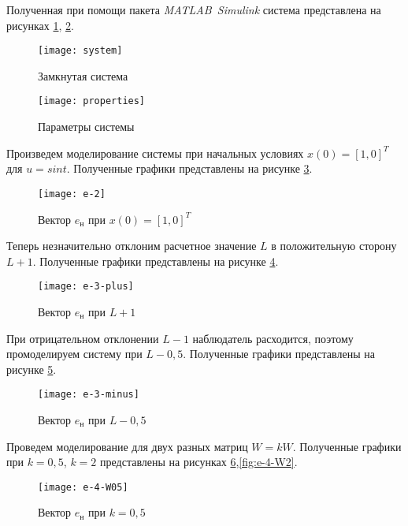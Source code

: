 \documentclass[14pt, a4paper]{extarticle}
\begin{document}
	Полученная при помощи пакета \textit{MATLAB~Simulink} система представлена на рисунках \ref{fig:system}, \ref{fig:properties}.
	
	\begin{figure}[H]
		\centering
		\texttt{[image: system]}
		\caption{Замкнутая система}
		\label{fig:system}
	\end{figure}
	
	\begin{figure}[H]
		\centering
		\texttt{[image: properties]}
		\caption{Параметры системы}
		\label{fig:properties}
	\end{figure}

	Произведем моделирование системы при начальных условиях $x(0)=[1,0]^T$ для $u = sint$. Полученные графики представлены на рисунке \ref{fig:e-2}.
	
	\begin{figure}[H]
		\centering
		\texttt{[image: e-2]}
		\caption{Вектор $e_\text{н}$ при $x(0)=[1,0]^T$}
		\label{fig:e-2}
	\end{figure}
	
	Теперь незначительно отклоним расчетное значение $L$ в положительную сторону $L+1$. Полученные графики представлены на рисунке \ref{fig:e-3-plus}.
	
	\begin{figure}[H]
		\centering
		\texttt{[image: e-3-plus]}
		\caption{Вектор $e_\text{н}$ при $L+1$}
		\label{fig:e-3-plus}
	\end{figure}
	
	При отрицательном отклонении $L-1$ наблюдатель расходится, поэтому промоделируем систему при $L-0,5$. Полученные графики представлены на рисунке \ref{fig:e-3-minus}.

	\begin{figure}[H]
		\centering
		\texttt{[image: e-3-minus]}
		\caption{Вектор $e_\text{н}$ при $L-0,5$}
		\label{fig:e-3-minus}
	\end{figure}
	
	Проведем моделирование для двух разных матриц $W = kW$. Полученные графики при $k=0,5$, $k=2$ представлены на рисунках \ref{fig:e-4-W05},\ref{fig:e-4-W2}.
	
	\begin{figure}[H]
		\centering
		\texttt{[image: e-4-W05]}
		\caption{Вектор $e_\text{н}$ при $k=0,5$}
		\label{fig:e-4-W05}
	\end{figure}
	
\end{document}
